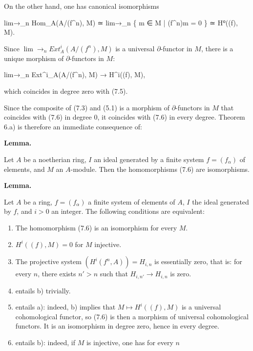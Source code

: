 \documentclass[
]{article}
\newenvironment{Shaded}{}{}
\newcommand{\NormalTok}[1]{#1}
\begin{document}
On the other hand, one has canonical isomorphisms

\begin{Shaded}
\begin{Highlighting}[]
\NormalTok{lim→\_n Hom\_A(A/(f\^{}n), M) ≃ lim→\_n \{ m ∈ M | (f\^{}n)m = 0 \} ≃ H⁰((f), M).}
\end{Highlighting}
\end{Shaded}

Since \(\lim\to_{n} Ext^{i}_{A}(A/(f^{n}), M)\) is a universal
\(\partial\)-functor in \(M\), there is a unique morphism of
\(\partial\)-functors in \(M\):

\begin{Shaded}
\begin{Highlighting}[]
\NormalTok{lim→\_n Ext\^{}i\_A(A/(f\^{}n), M) → H\^{}i((f), M),}
\end{Highlighting}
\end{Shaded}

which coincides in degree zero with (7.5).

Since the composite of (7.3) and (5.1) is a morphism of
\(\partial\)-functors in \(M\) that coincides with (7.6) in degree 0, it
coincides with (7.6) in every degree. Theorem 6.a) is therefore an
immediate consequence of:

\textbf{Lemma.}

Let \(A\) be a noetherian ring, \(I\) an ideal generated by a finite
system \(f = (f_{\alpha})\) of elements, and \(M\) an \(A\)-module. Then
the homomorphisms (7.6) are isomorphisms.

\textbf{Lemma.}

Let \(A\) be a ring, \(f = (f_{\alpha})\) a finite system of elements of
\(A\), \(I\) the ideal generated by \(f\), and \(i > 0\) an integer. The
following conditions are equivalent:

\begin{enumerate}
\def\labelenumi{\alph{enumi})}
\item
  The homomorphism (7.6) is an isomorphism for every \(M\).
\item
  \(H^{i}((f), M) = 0\) for \(M\) injective.
\item
  The projective system \((H^{i}(f^{n}, A)) = H_{i,n}\) is essentially
  zero, that is: for every \(n\), there exists \(n' > n\) such that
  \(H_{i,n'} \to H_{i,n}\) is zero.
\item
  entails b) trivially.
\item
  entails a): indeed, b) implies that \(M \mapsto H^{i}((f), M)\) is a
  universal cohomological functor, so (7.6) is then a morphism of
  universal cohomological functors. It is an isomorphism in degree zero,
  hence in every degree.
\item
  entails b): indeed, if \(M\) is injective, one has for every \(n\)
\end{enumerate}
\end{document}

